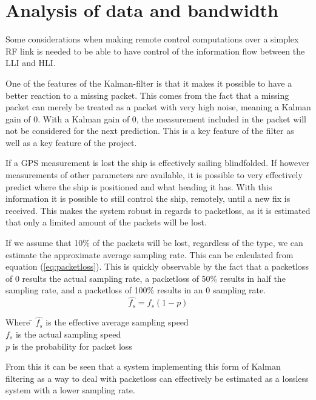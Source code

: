 \section{Analysis of data and bandwidth}
\label{sec:PacketLoss}
Some considerations when making remote control computations over a simplex \ac{RF} link is needed to be able to have control of the information flow between the \ac{LLI} and \ac{HLI}. 


One of the features of the Kalman-filter is that it makes it possible to have a better reaction to a missing packet. This comes from the fact that a missing packet can merely be treated as a packet with very high noise, meaning a Kalman gain of 0. With a Kalman gain of 0, the measurement included in the packet will not be considered for the next prediction. This is a key feature of the filter as well as a key feature of the project.

If a \ac{GPS} measurement is lost the ship is effectively sailing blindfolded. If however measurements of other parameters are available, it is possible to very effectively predict where the ship is positioned and what heading it has. With this information it is possible to still control the ship, remotely, until a new fix is received. This makes the system robust in regards to packetloss, as it is estimated that only a limited amount of the packets will be lost. 

If we assume that 10$\%$ of the packets will be lost, regardless of the type, we can estimate the approximate average sampling rate. This can be calculated from equation (\ref{eq:packetloss}). This is quickly observable by the fact that a packetloss of 0 results the actual sampling rate, a packetloss of 50$\%$ results in half the sampling rate, and a packetloss of 100$\%$ results in an 0 sampling rate.
\begin{equation}
\hat{f_s} = f_s(1-p)
\label{eq:packetloss}
\end{equation}

\begin{tabbing}
Where \= $\hat{f_s}$ is the effective average sampling speed\\
\> $f_s$ is the actual sampling speed\\
\> $p$ is the probability for packet loss
\end{tabbing}
From this it can be seen that a system implementing this form of Kalman filtering as a way to deal with packetloss can effectively be estimated as a lossless system with a lower sampling rate.

